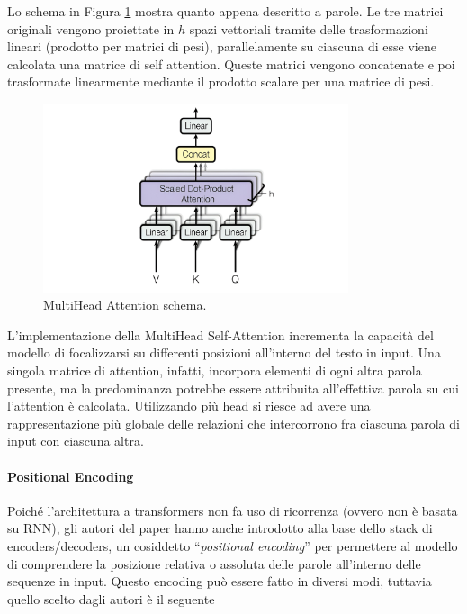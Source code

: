 \documentclass[12pt,a4paper,twoside,openright]{book}
\begin{document}
Lo schema in Figura \ref{fig:multihead-attention} mostra quanto appena descritto a parole. Le tre matrici originali vengono proiettate in $h$ spazi vettoriali tramite delle trasformazioni lineari (prodotto per matrici di pesi), parallelamente su ciascuna di esse viene calcolata una matrice di self attention. Queste matrici vengono concatenate e poi trasformate linearmente mediante il prodotto scalare per una matrice di pesi. 

\begin{figure}
    \centering
    \includegraphics[width=0.8\textwidth]{images/mh_attention.png}
    \caption{MultiHead Attention schema.}
    \label{fig:multihead-attention}
\end{figure}

L'implementazione della MultiHead Self-Attention incrementa la capacità del modello di focalizzarsi su differenti posizioni all'interno del testo in input. Una singola matrice di attention, infatti, incorpora elementi di ogni altra parola presente, ma la predominanza potrebbe essere attribuita all'effettiva parola su cui l'attention è calcolata. Utilizzando più head si riesce ad avere una rappresentazione più globale delle relazioni che intercorrono fra ciascuna parola di input con ciascuna altra.

\paragraph{Positional Encoding}
Poiché l'architettura a transformers non fa uso di ricorrenza (ovvero non è basata su RNN), gli autori del paper \cite{DBLP:journals/corr/VaswaniSPUJGKP17} hanno anche introdotto alla base dello stack di encoders/decoders, un cosiddetto ``\emph{positional encoding}'' per permettere al modello di comprendere la posizione relativa o assoluta delle parole all'interno delle sequenze in input.
Questo encoding può essere fatto in diversi modi, tuttavia quello scelto dagli autori è il seguente
\end{document}
